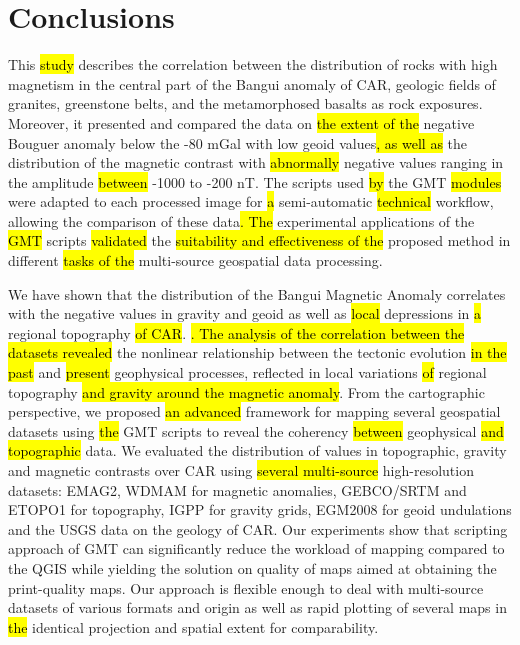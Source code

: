 \documentclass[minerals,article,submit,pdftex,moreauthors]{Definitions/mdpi}
\begin{document}
\section{Conclusions}

This \hl{study} describes the correlation between the distribution of rocks with high magnetism in the central part of the Bangui anomaly of CAR, geologic fields of granites, greenstone belts, and the metamorphosed basalts as rock exposures. Moreover, it presented and compared the data on \hl{the extent of the }negative Bouguer anomaly below the -80 mGal with low geoid values\hl{, as well as }the distribution of the magnetic contrast with \hl{abnormally} negative values ranging in the amplitude \hl{between} -1000 to -200 nT. The scripts used \hl{by} the GMT \hl{modules }were adapted to each processed image for \hl{a }semi-automatic \hl{technical }workflow, allowing the comparison of these data\hl{. The }experimental applications of the \hl{GMT} scripts \hl{validated} the \hl{suitability and effectiveness of the }proposed method in different \hl{tasks of the }multi-source geospatial data processing.  

We have shown that the distribution of the Bangui Magnetic Anomaly correlates with the negative values in gravity and geoid as well as \hl{local }depressions in \hl{a }regional topography \hl{of CAR}. \hl{. The analysis of the correlation between the datasets revealed }the nonlinear relationship\hl{ }between the tectonic evolution \hl{in the past} and \hl{present }geophysical processes, reflected in local variations \hl{of} regional topography \hl{and gravity around the magnetic anomaly}. From the cartographic perspective, we proposed \hl{an advanced} framework for mapping several geospatial datasets using \hl{the }GMT scripts to reveal the coherency \hl{between }geophysical \hl{and topographic }data. We\hl{ }evaluated the distribution of values in topographic, gravity and magnetic contrasts over CAR using \hl{several multi-source }high-resolution\hl{ }datasets: EMAG2, WDMAM for magnetic anomalies, GEBCO/SRTM and ETOPO1 for topography, IGPP for gravity grids, EGM2008 for geoid undulations and the USGS data on the geology of CAR. Our experiments show that scripting approach of GMT can significantly reduce the workload of mapping compared to the QGIS while yielding the solution on quality of maps aimed at obtaining the print-quality maps. Our approach is\hl{ }flexible enough to deal with multi-source datasets of various formats and origin as well as rapid plotting of several maps in \hl{the }identical projection and spatial extent for comparability. 
\end{document}
